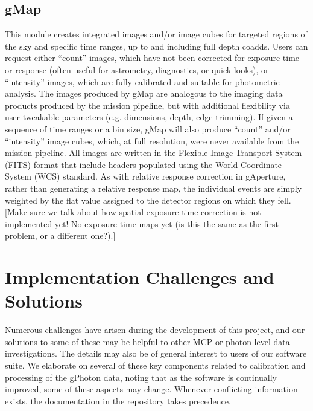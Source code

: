 \documentclass[5p]{elsarticle}
\begin{document}
\subsection{gMap}
This module creates integrated images and/or image cubes for targeted regions of the sky and specific time ranges, up to and including full depth coadds. Users can request either ``count'' images, which have not been corrected for exposure time or response (often useful for astrometry, diagnostics, or quick-looks), or ``intensity'' images, which are fully calibrated and suitable for photometric analysis. The images produced by gMap are analogous to the imaging data products produced by the mission pipeline, but with additional flexibility via user-tweakable parameters (e.g. dimensions, depth, edge trimming). If given a sequence of time ranges or a bin size, gMap will also produce ``count'' and/or ``intensity'' image cubes, which, at full resolution, were never available from the mission pipeline. All images are written in the Flexible Image Transport System (FITS) format that include headers populated using the World Coordinate System (WCS) standard.  As with relative response correction in gAperture, rather than generating a relative response map, the individual events are simply weighted by the flat value assigned to the detector regions on which they fell. {\color{red}[Make sure we talk about how spatial exposure time correction is not implemented yet!  No exposure time maps yet (is this the same as the first problem, or a different one?).]}

\section{Implementation Challenges and Solutions}
\label{implementation}
Numerous challenges have arisen during the development of this project, and our solutions to some of these may be helpful to other MCP or photon-level data investigations. The details may also be of general interest to users of our software suite.  We elaborate on several of these key components related to calibration and processing of the gPhoton data, noting that as the software is continually improved, some of these aspects may change.  Whenever conflicting information exists, the documentation in the repository takes precedence.
\end{document}
